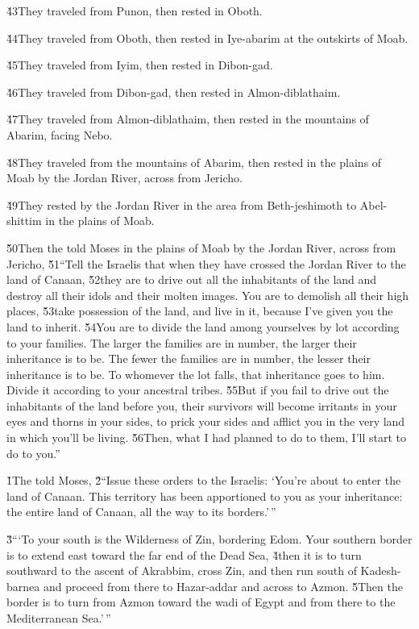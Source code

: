 \v{43}They traveled from Punon, then rested in Oboth.

\v{44}They traveled from Oboth, then rested in Iye-abarim at the outskirts of Moab.

\v{45}They traveled from Iyim, then rested in Dibon-gad.

\v{46}They traveled from Dibon-gad, then rested in Almon-diblathaim.

\v{47}They traveled from Almon-diblathaim, then rested in the mountains of Abarim, facing Nebo.

\v{48}They traveled from the mountains of Abarim, then rested in the plains of Moab by the Jordan River, across from Jericho.

\v{49}They rested by the Jordan River in the area from Beth-jeshimoth to Abel-shittim in the plains of Moab.

\v{50}Then the  told Moses in the plains of Moab by the Jordan River, across from Jericho, \v{51}``Tell the Israelis that when they have crossed the Jordan River to the land of Canaan, \v{52}they are to drive out all the inhabitants of the land and destroy all their idols and their molten images. You are to demolish all their high places, \v{53}take possession of the land, and live in it, because I've given you the land to inherit. \v{54}You are to divide the land among yourselves by lot according to your families. The larger the families are in number, the larger their inheritance is to be. The fewer the families are in number, the lesser their inheritance is to be. To whomever the lot falls, that inheritance goes to him. Divide it according to your ancestral tribes. \v{55}But if you fail to drive out the inhabitants of the land before you, their survivors will become irritants in your eyes and thorns in your sides, to prick your sides and afflict you in the very land in which you'll be living. \v{56}Then, what I had planned to do to them, I'll start to do to you.''

\v{1}The  told Moses, \v{2}``Issue these orders to the Israelis: `You're about to enter the land of Canaan. This territory has been apportioned to you as your inheritance: the entire land of Canaan, all the way to its borders.'\,''

\v{3}```To your south is the Wilderness of Zin, bordering Edom. Your southern border is to extend east toward the far end of the Dead Sea, \v{4}then it is to turn southward to the ascent of Akrabbim, cross Zin, and then run south of Kadesh-barnea and proceed from there to Hazar-addar and across to Azmon. \v{5}Then the border is to turn from Azmon toward the wadi of Egypt and from there to the Mediterranean Sea.'\,''


